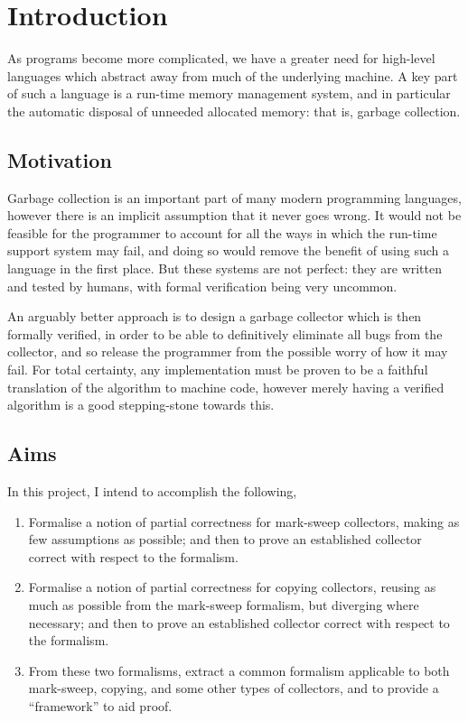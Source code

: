 \chapter{Introduction}
\label{sec:intro}

As programs become more complicated, we have a greater need for
high-level languages which abstract away from much of the underlying
machine. A key part of such a language is a run-time memory management
system, and in particular the automatic disposal of unneeded allocated
memory: that is, garbage collection.

\section{Motivation}
\label{sec:intro-motivation}

Garbage collection is an important part of many modern programming
languages, however there is an implicit assumption that it never goes
wrong. It would not be feasible for the programmer to account for all
the ways in which the run-time support system may fail, and doing so
would remove the benefit of using such a language in the first
place. But these systems are not perfect: they are written and tested
by humans, with formal verification being very uncommon.

An arguably better approach is to design a garbage collector which is
then formally verified, in order to be able to definitively eliminate
all bugs from the collector, and so release the programmer from the
possible worry of how it may fail. For total certainty, any
implementation must be proven to be a faithful translation of the
algorithm to machine code, however merely having a verified algorithm
is a good stepping-stone towards this.

\section{Aims}
\label{sec:intro-goals}

In this project, I intend to accomplish the following,

\begin{enumerate}
  \item Formalise a notion of partial correctness for mark-sweep
    collectors, making as few assumptions as possible; and then to prove
    an established collector correct with respect to the formalism.

  \item Formalise a notion of partial correctness for copying
    collectors, reusing as much as possible from the mark-sweep
    formalism, but diverging where necessary; and then to prove an
    established collector correct with respect to the formalism.

  \item From these two formalisms, extract a common formalism
    applicable to both mark-sweep, copying, and some other types of
    collectors, and to provide a ``framework'' to aid proof.
\end{enumerate}

